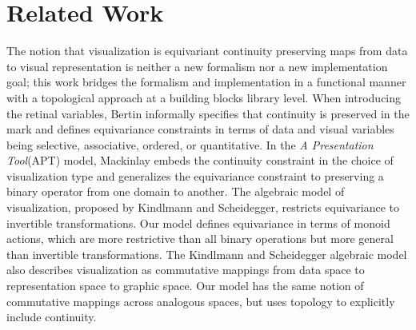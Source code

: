 \documentclass[journal]{vgtc}                %
\begin{document}
\section{Related Work}
The notion that visualization is equivariant continuity preserving maps from data to visual representation is neither a new formalism nor a new implementation goal; this work bridges the formalism and implementation in a functional manner with a topological approach at a building blocks library\cite{wongsuphasawatNavigatingWideWorld2021} level. When introducing the retinal variables, Bertin informally specifies that continuity is preserved in the mark and defines equivariance constraints in terms of data and visual variables being selective, associative, ordered, or quantitative\cite{bertinSemiologyGraphicsDiagrams2011a}. In the \textit{A Presentation Tool}(APT) model, Mackinlay embeds the continuity constraint in the choice of visualization type and generalizes the equivariance constraint to preserving a binary operator from one domain to another. The algebraic model of visualization\cite{kindlmannAlgebraicProcessVisualization2014}, proposed by Kindlmann and Scheidegger, restricts equivariance to invertible transformations. Our model defines equivariance in terms of monoid actions, which are more restrictive than all binary operations but more general than invertible transformations. The Kindlmann and Scheidegger algebraic model also describes visualization as commutative mappings from data space to representation space to graphic space. Our model has the same notion of commutative mappings across analogous spaces, but uses topology to explicitly include continuity. 
\end{document}
